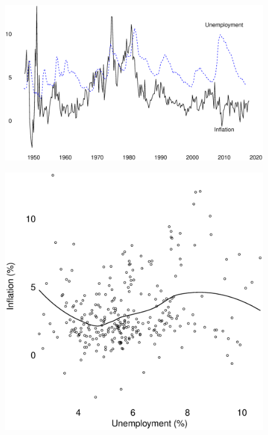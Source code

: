 \documentclass{beamer}
\begin{document}
\begin{frame}
  \begin{figure}
    \includegraphics[scale=.25]{pc3.eps}
  \end{figure}
\end{frame}

\begin{frame}
  \begin{figure}
    \includegraphics[scale=.25]{pc6.eps}
  \end{figure}
\end{frame}
\end{document}
